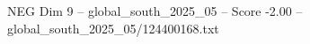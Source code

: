 \begin{textsample}{NEG Dim 9 – global\_south\_2025\_05 – Score -2.00 – global\_south\_2025\_05/124400168.txt}
\end{textsample}
